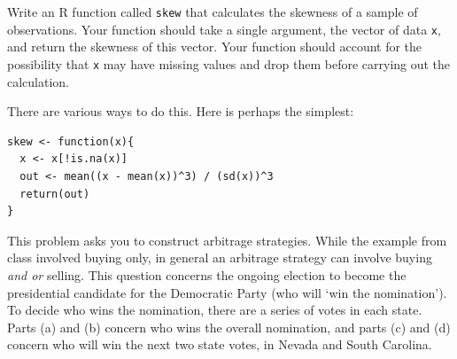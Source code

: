 \documentclass[addpoints,12pt]{exam}
\begin{document}
\begin{questions}


\question[15] Write an R function called \texttt{skew} that calculates the skewness of a sample of observations.
Your function should take a single argument, the vector of data \texttt{x}, and return the skewness of this vector.
Your function should account for the possibility that \texttt{x} may have missing values and drop them before carrying out the calculation.
\begin{solution}[3.75in]
  There are various ways to do this. Here is perhaps the simplest:
  \begin{verbatim}
skew <- function(x){
  x <- x[!is.na(x)] 
  out <- mean((x - mean(x))^3) / (sd(x))^3
  return(out)
}
  \end{verbatim}
\end{solution}

\question This problem asks you to construct arbitrage strategies.
While the example from class involved buying only, in general an arbitrage strategy can involve buying \emph{and or} selling. This question concerns the ongoing election to become the presidential candidate for the Democratic Party (who will `win the nomination'). To decide who wins the nomination, there are a series of votes in each state. Parts (a) and (b) concern who wins the overall nomination, and parts (c) and (d) concern who will win the next two state votes, in Nevada and South Carolina.


\end{questions}
\end{document}

